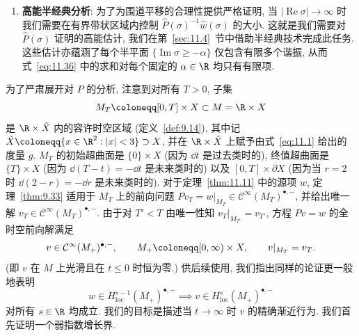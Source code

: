 \begin{enumerate}[label=(\arabic*)]
    \item \textbf{高能半经典分析}: 为了为围道平移的合理性提供严格证明, 当 $|\operatorname{Re}\sigma| \to \infty$ 时我们需要在有界带状区域内控制 $\widehat{P}(\sigma)^{-1} \hat w(\sigma)$ 的大小. 这就是我们需要对 $\widehat{P}(\sigma)$ 证明的高能估计, 我们在第~\ref{sec:11.4}~节中借助半经典技术完成此任务. 这些估计亦蕴涵了每个半平面 $\{\operatorname{Im}\sigma \ge -\alpha\}$ 仅包含有限多个谐振, 从而式~\eqref{eq:11.36} 中的求和对每个固定的 $\alpha \in \R$ 均只有有限项.
\end{enumerate}

为了严肃展开对 $P$ 的分析, 注意到对所有 $T > 0$, 子集
\begin{equation}\label{eq:11.42}
    M_T \defeq [0, T] \times X \subset M = \R \times X
\end{equation}
是 $\R \times \tilde X$ 内的容许时空区域 (定义~\ref{def:9.14}), 其中记 $\tilde X \defeq \{x \in \R^2 : |x| < 3\} \supset X$, 并在 $\R \times \tilde X$ 上赋予由式~\eqref{eq:11.1} 给出的度量 $g$. $M_T$ 的初始超曲面是 $\{0\} \times X$ (因为 $\dd t$ 是过去类时的), 终值超曲面是 $\{T\} \times X$ (因为 $\dd(T - t) = -\dd t$ 是未来类时的) 以及 $[0, T] \times \partial X$ (因为当 $r = 2$ 时 $\dd(2 - r) = -\dd r$ 是未来类时的). 对于定理~\ref{thm:11.11} 中的源项 $w$, 定理~\ref{thm:9.33} 适用于 $M_T$ 上的前向问题 $P v_T = w|_{M_T} \in \mathcal{C}^\infty(M_T)^{\bullet, -}$, 并给出唯一解 $v_T \in \mathcal{C}^\infty(M_T)^{\bullet, -}$. 由于对 $T' < T$ 由唯一性知 $v_T|_{M_{T'}} = v_{T'}$, 方程 $P v = w$ 的全时空前向解满足
\begin{equation}\label{eq:11.43}
    v \in \mathcal{C}^\infty(M_+)^{\bullet, -}, \qquad M_+ \defeq [0, \infty) \times X, \qquad v|_{M_T} = v_T.
\end{equation}
(即 $v$ 在 $M$ 上光滑且在 $t \le 0$ 时恒为零.) 供后续使用, 我们指出同样的论证更一般地表明
\begin{equation}\label{eq:11.44}
    w \in H_{\mathrm{loc}}^{s-1}(M_+)^{\bullet, -} \implies v \in H_{\mathrm{loc}}^s(M_+)^{\bullet, -}
\end{equation}
对所有 $s \in \R$ 均成立. 我们的目标是描述当 $t \to \infty$ 时 $v$ 的精确渐近行为. 我们首先证明一个弱指数增长界.

